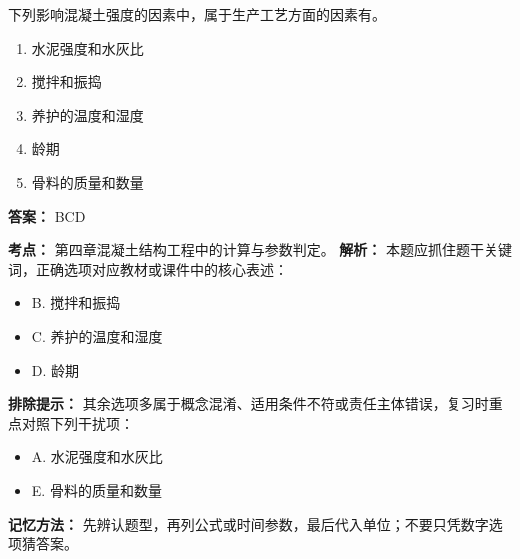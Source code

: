 \documentclass[UTF8,fontset=fandol,11pt]{ctexart}
\begin{document}
\begin{quizbox}[title={第 62 题}]
下列影响混凝土强度的因素中，属于生产工艺方面的因素有。\\
\begin{enumerate}[label=\Alph*.]
\item 水泥强度和水灰比
\item 搅拌和振捣
\item 养护的温度和湿度
\item 龄期
\item 骨料的质量和数量
\end{enumerate}
\textbf{答案：} BCD
\vspace{0.25em}
\begin{answerbox}[title={考点解析}]
\textbf{考点：} 第四章混凝土结构工程中的计算与参数判定。
\textbf{解析：} 本题应抓住题干关键词，正确选项对应教材或课件中的核心表述：
\begin{itemize}
\item B. 搅拌和振捣
\item C. 养护的温度和湿度
\item D. 龄期
\end{itemize}
\textbf{排除提示：} 其余选项多属于概念混淆、适用条件不符或责任主体错误，复习时重点对照下列干扰项：
\begin{itemize}
\item A. 水泥强度和水灰比
\item E. 骨料的质量和数量
\end{itemize}
\textbf{记忆方法：} 先辨认题型，再列公式或时间参数，最后代入单位；不要只凭数字选项猜答案。
\end{answerbox}
\end{quizbox}
\end{document}
